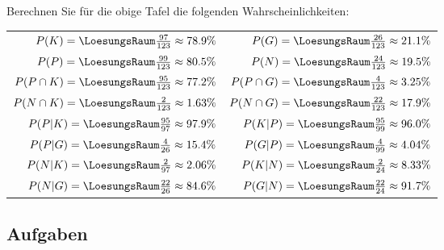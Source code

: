 Berechnen Sie für die obige Tafel die folgenden Wahrscheinlichkeiten:

\renewcommand{\arraystretch}{2}
\begin{tabular}{rr}
$P(K) = \LoesungsRaum{\frac{97}{123} \approx{} 78.9\%}$&
$P(G) = \LoesungsRaum{\frac{26}{123} \approx{} 21.1\%}$\\
$P(P) = \LoesungsRaum{\frac{99}{123} \approx{} 80.5\%}$&
$P(N) = \LoesungsRaum{\frac{24}{123} \approx{} 19.5\%}$\\


$P(P\cap K) = \LoesungsRaum{\frac{95}{123} \approx{} 77.2\%}$&
$P(P\cap G) = \LoesungsRaum{\frac{4}{123}  \approx{} 3.25\%}$\\
$P(N\cap K) = \LoesungsRaum{\frac{2}{123}  \approx{} 1.63\%}$&
$P(N\cap G) = \LoesungsRaum{\frac{22}{123} \approx{} 17.9\%}$\\

$P(P|K) = \LoesungsRaum{\frac{95}{97} \approx{} 97.9\%}$&
$P(K|P) = \LoesungsRaum{\frac{95}{99} \approx{} 96.0\%}$\\

$P(P|G) = \LoesungsRaum{\frac{4}{26} \approx{} 15.4\%}$&
$P(G|P) = \LoesungsRaum{\frac{4}{99} \approx{} 4.04\%}$\\

$P(N|K) = \LoesungsRaum{\frac{2}{97} \approx{} 2.06\%}$&
$P(K|N) = \LoesungsRaum{\frac{2}{24} \approx{} 8.33\%}$\\

$P(N|G) = \LoesungsRaum{\frac{22}{26} \approx{} 84.6\%}$&
$P(G|N) = \LoesungsRaum{\frac{22}{24} \approx{} 91.7\%}$\\
\end{tabular}
\renewcommand{\arraystretch}{1}


\subsection*{Aufgaben}
\newpage
